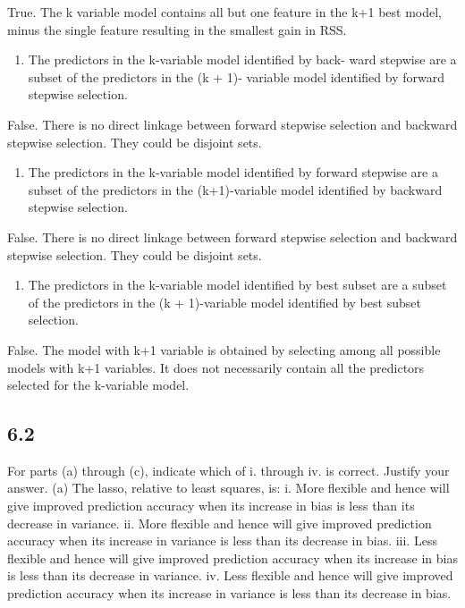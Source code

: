 \documentclass[]{article}
\providecommand{\tightlist}{%
  \setlength{\itemsep}{0pt}\setlength{\parskip}{0pt}}
\begin{document}
True. The k variable model contains all but one feature in the k+1 best
model, minus the single feature resulting in the smallest gain in RSS.

\begin{enumerate}
\def\labelenumi{\roman{enumi}.}
\setcounter{enumi}{2}
\tightlist
\item
  The predictors in the k-variable model identified by back- ward
  stepwise are a subset of the predictors in the (k + 1)- variable model
  identified by forward stepwise selection.
\end{enumerate}

False. There is no direct linkage between forward stepwise selection and
backward stepwise selection. They could be disjoint sets.

\begin{enumerate}
\def\labelenumi{\roman{enumi}.}
\setcounter{enumi}{3}
\tightlist
\item
  The predictors in the k-variable model identified by forward stepwise
  are a subset of the predictors in the (k+1)-variable model identified
  by backward stepwise selection.
\end{enumerate}

False. There is no direct linkage between forward stepwise selection and
backward stepwise selection. They could be disjoint sets.

\begin{enumerate}
\def\labelenumi{\alph{enumi}.}
\setcounter{enumi}{21}
\tightlist
\item
  The predictors in the k-variable model identified by best subset are a
  subset of the predictors in the (k + 1)-variable model identified by
  best subset selection.
\end{enumerate}

False. The model with k+1 variable is obtained by selecting among all
possible models with k+1 variables. It does not necessarily contain all
the predictors selected for the k-variable model.

\subsection{6.2}\label{section-1}

For parts (a) through (c), indicate which of i. through iv. is correct.
Justify your answer. (a) The lasso, relative to least squares, is: i.
More flexible and hence will give improved prediction accuracy when its
increase in bias is less than its decrease in variance. ii. More
flexible and hence will give improved prediction accuracy when its
increase in variance is less than its decrease in bias. iii. Less
flexible and hence will give improved prediction accuracy when its
increase in bias is less than its decrease in variance. iv. Less
flexible and hence will give improved prediction accuracy when its
increase in variance is less than its decrease in bias.
\end{document}
